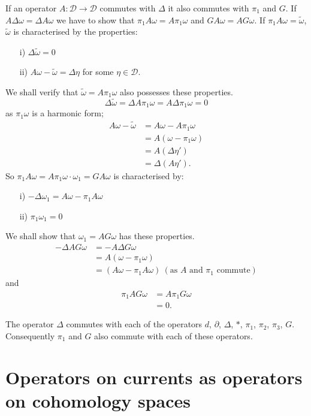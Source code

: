 If an operator $A:\mathscr{D}\to \mathscr{D}$ commutes with $\Delta$
it also commutes with $\pi_{1}$ and $G$. If $A\Delta\omega=\Delta
A\omega$ we have to show that $\pi_{1}A\omega=A\pi_{1}\omega$ and
$GA\omega=AG\omega$. If $\pi_{1}A\omega=\widetilde{\omega}$,
$\widetilde{\omega}$ is characterised by the properties:
\begin{itemize}
\item[i)] $\Delta\widetilde{\omega}=0$

\item[ii)] $A\omega-\widetilde{\omega}=\Delta \eta$ for some
  $\eta\in\mathscr{D}$. 
\end{itemize}
We shall verify that $\widetilde{\omega}=A\pi_{1}\omega$ also
possesses these properties.
$$
\Delta\widetilde{\omega}=\Delta A\pi_{1}\omega=A\Delta \pi_{1}\omega=0
$$
as $\pi_{1}\omega$ is a harmonic form;
\begin{align*}
A\omega -\widetilde{\omega} &= A\omega-A\pi_{1}\omega\\
&= A(\omega-\pi_{1}\omega)\\
&= A(\Delta\eta')\\
&= \Delta(A\eta').
\end{align*}
So $\pi_{1}A\omega=A\pi_{1}\omega\cdot\omega_{1}=GA\omega$ is
characterised by:
\begin{itemize}
\item[i)] $-\Delta\omega_{1}=A\omega-\pi_{1}A\omega$

\item[ii)] $\pi_{1}\omega_{1}=0$
\end{itemize}
We shall show that $\omega_{1}=AG\omega$ has these properties.
\begin{align*}
-\Delta AG\omega &= -A\Delta G\omega\\
&= A(\omega-\pi_{1}\omega)\\
&= (A\omega-\pi_{1}A\omega)~(\text{as } A \text{ and } \pi_{1}\text{ commute})
\end{align*}\pageoriginale
and 
\begin{align*}
\pi_{1}AG\omega &= A\pi_{1}G\omega\\
&= 0.
\end{align*}

The operator $\Delta$ commutes with each of the operators $d$,
$\partial$, $\Delta$, $\ast$, $\pi_{1}$, $\pi_{2}$, $\pi_{3}$,
$G$. Consequently $\pi_{1}$ and $G$ also commute with each of these
operators.

\section*{Operators on currents as operators on cohomology spaces}

